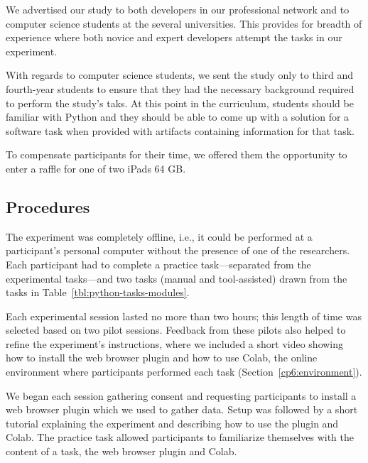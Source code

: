 {We advertised our study to both developers in our professional network and to computer science students at the several universities. 
This provides for breadth of experience where both novice and expert developers attempt the tasks in our experiment. 


With regards to computer science students, we sent the study only to third and fourth-year students to ensure that they had the necessary background required to perform the study's taks.
At this point in the curriculum, students should be familiar with Python and they should be able to come up with a solution 
for a software task when provided with artifacts containing information for that task.


To compensate participants for their time, we offered them the opportunity to enter a raffle for one of two iPads 64 GB.






\subsection{Procedures}
\label{cp6:evaluation-procedures}



The experiment was completely offline, i.e., it could be performed at a participant's personal computer
without the presence of one of the researchers. Each participant had to complete a practice task---separated from the experimental tasks---and two tasks (manual and tool-assisted) drawn from the tasks in Table~\ref{tbl:python-tasks-modules}. 


Each experimental session lasted no more than two hours; this length of time was selected based on two pilot sessions. 
Feedback from these pilots also helped to refine the experiment's instructions, where we included a short video showing how to install the web browser plugin and how to use Colab, the online environment where participants performed each task (Section~\ref{cp6:environment}).






We began each session gathering consent and requesting participants to install a web browser plugin which we used to gather data.
Setup was followed by a short tutorial explaining the experiment and describing how to use the plugin and Colab. 
The practice task allowed participants to familiarize themselves with the content of a task, the web browser plugin and Colab. 



}
